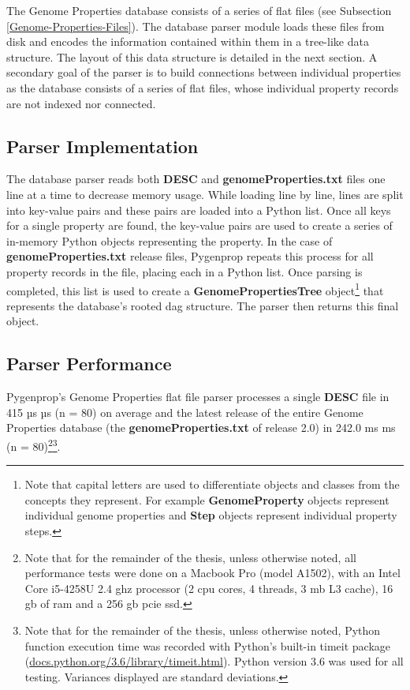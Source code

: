 The Genome Properties database consists of a series of flat files (see 
Subsection \ref{Genome-Properties-Files}). The database parser module loads 
these files from disk and encodes the information contained within them in a 
tree-like data structure. The layout of this data structure is detailed in the 
next section. A secondary goal of the parser is to build connections between 
individual properties as the database consists of a series of flat files, whose 
individual property records are not indexed nor connected. 

\subsection{Parser Implementation}

The database parser reads both \textbf{DESC} and \textbf{genomeProperties.txt} 
files one line at a time to decrease memory usage. While loading line by line, 
lines are split into key-value pairs and these pairs are loaded into a Python 
list. Once all keys for a single property are found, the key-value pairs are 
used to create a series of in-memory Python objects representing the property. 
In the case of \textbf{genomeProperties.txt} release files, Pygenprop repeats 
this process for all property records in the file, placing each in a Python 
list.  Once parsing is completed, this list is used to create a 
\textbf{GenomePropertiesTree} object\footnote{Note that capital letters are used 
to differentiate objects and classes from the concepts they represent. For 
example \textbf{GenomeProperty} objects represent individual genome properties 
and \textbf{Step} objects represent individual property steps.} that represents 
the database's rooted \gls{dag} structure. The parser then returns this final 
object.

\subsection{Parser Performance}

Pygenprop's Genome Properties flat file parser processes a single \textbf{DESC} 
file in 415 µs  µs (\gls{n} = 80) on average and the latest release of 
the entire Genome Properties database (the \textbf{genomeProperties.txt} of 
release 2.0) in 242.0 ms  ms (\gls{n} = 80)\footnote{Note that for 
the remainder of the thesis, unless otherwise noted, all performance tests were 
done on a Macbook Pro (model A1502), with an Intel Core i5-4258U 2.4 \gls{ghz} 
processor (2 \gls{cpu} cores, 4 threads, 3 \gls{mb} L3 cache), 16 \gls{gb} of 
\gls{ram} and a 256 \gls{gb}  \gls{pcie} \gls{ssd}.}\footnote{Note that for the 
remainder of the thesis, unless otherwise noted, Python function execution time 
was recorded with Python's built-in timeit package 
(\href{http://docs.python.org/3.6/library/timeit.html}{docs.python.org/3.6/library/timeit.html}). 
Python version 3.6 was used for all testing. Variances displayed are standard 
deviations.}.

